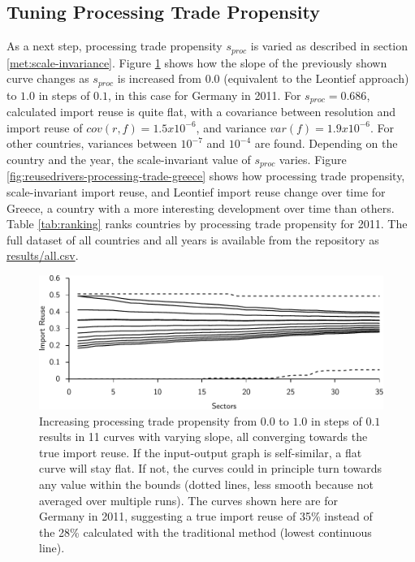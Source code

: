 \documentclass[english]{uzhpub}
\begin{document}
\subsection{Tuning Processing Trade Propensity}
As a next step, processing trade propensity $s_{proc}$ is varied as described in section \ref{met:scale-invariance}. Figure \ref{fig:globalpref} shows how the slope of the previously shown curve changes as $s_{proc}$ is increased from $0.0$ (equivalent to the Leontief approach) to $1.0$ in steps of $0.1$, in this case for Germany in 2011. For $s_{proc}=0.686$, calculated import reuse is quite flat, with a covariance between resolution and import reuse of $cov(r, f) = 1.5x10^{-6}$, and variance $var(f)=1.9x10^{-6}$. For other countries, variances between $10^{-7}$ and $10^{-4}$ are found. Depending on the country and the year, the scale-invariant value of $s_{proc}$ varies. Figure \ref{fig:reusedrivers-processing-trade-greece} shows how processing trade propensity, scale-invariant import reuse, and Leontief import reuse change over time for Greece, a country with a more interesting development over time than others. Table \ref{tab:ranking} ranks countries by processing trade propensity for 2011. The full dataset of all countries and all years is available from the repository as \href{https://github.com/meisserecon/importreuse/blob/master/results/all.csv}{results/all.csv}.

\begin{figure}
\centering
\includegraphics[scale=0.8]{../results/germanrelief2011}
\caption{Increasing processing trade propensity from $0.0$ to $1.0$ in steps of $0.1$ results in 11 curves with varying slope, all converging towards the true import reuse. If the input-output graph is self-similar, a flat curve will stay flat. If not, the curves could in principle turn towards any value within the bounds (dotted lines, less smooth because not averaged over multiple runs). The curves shown here are for Germany in 2011, suggesting a true import reuse of 35\% instead of the 28\% calculated with the traditional method (lowest continuous line).} \label{fig:globalpref}
\end{figure}
\end{document}
